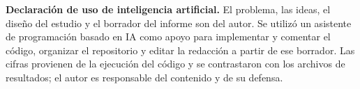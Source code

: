 \textbf{Declaración de uso de inteligencia artificial.} El problema, las ideas, el diseño del estudio y el borrador del informe son del autor. Se utilizó un asistente de programación basado en IA como apoyo para implementar y comentar el código, organizar el repositorio y editar la redacción a partir de ese borrador. Las cifras provienen de la ejecución del código y se contrastaron con los archivos de resultados; el autor es responsable del contenido y de su defensa.
